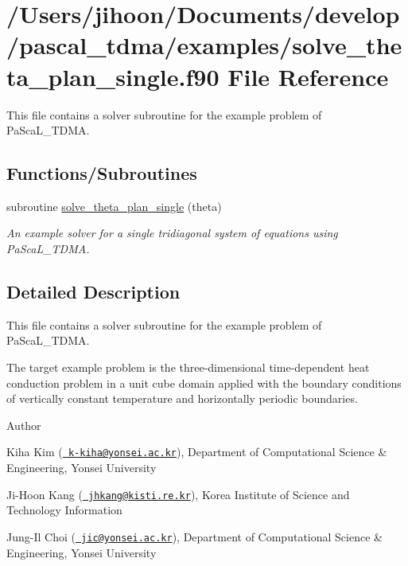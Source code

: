 \hypertarget{solve__theta__plan__single_8f90}{}\section{/\+Users/jihoon/\+Documents/develop/pascal\+\_\+tdma/examples/solve\+\_\+theta\+\_\+plan\+\_\+single.f90 File Reference}
\label{solve__theta__plan__single_8f90}


This file contains a solver subroutine for the example problem of Pa\+Sca\+L\+\_\+\+T\+D\+MA.  


\subsection*{Functions/\+Subroutines}
\begin{DoxyCompactItemize}
\item 
subroutine \mbox{\hyperlink{solve__theta__plan__single_8f90_a53ef6756822306f33a47be6a66232862}{solve\+\_\+theta\+\_\+plan\+\_\+single}} (theta)
\begin{DoxyCompactList}\small\item\em An example solver for a single tridiagonal system of equations using Pa\+Sca\+L\+\_\+\+T\+D\+MA. \end{DoxyCompactList}\end{DoxyCompactItemize}


\subsection{Detailed Description}
This file contains a solver subroutine for the example problem of Pa\+Sca\+L\+\_\+\+T\+D\+MA. 

The target example problem is the three-\/dimensional time-\/dependent heat conduction problem in a unit cube domain applied with the boundary conditions of vertically constant temperature and horizontally periodic boundaries. \begin{DoxyAuthor}{Author}

\end{DoxyAuthor}

\begin{DoxyItemize}
\item Kiha Kim (\href{mailto:k-kiha@yonsei.ac.kr}{\texttt{ k-\/kiha@yonsei.\+ac.\+kr}}), Department of Computational Science \& Engineering, Yonsei University
\item Ji-\/\+Hoon Kang (\href{mailto:jhkang@kisti.re.kr}{\texttt{ jhkang@kisti.\+re.\+kr}}), Korea Institute of Science and Technology Information
\item Jung-\/\+Il Choi (\href{mailto:jic@yonsei.ac.kr}{\texttt{ jic@yonsei.\+ac.\+kr}}), Department of Computational Science \& Engineering, Yonsei University
\end{DoxyItemize}

